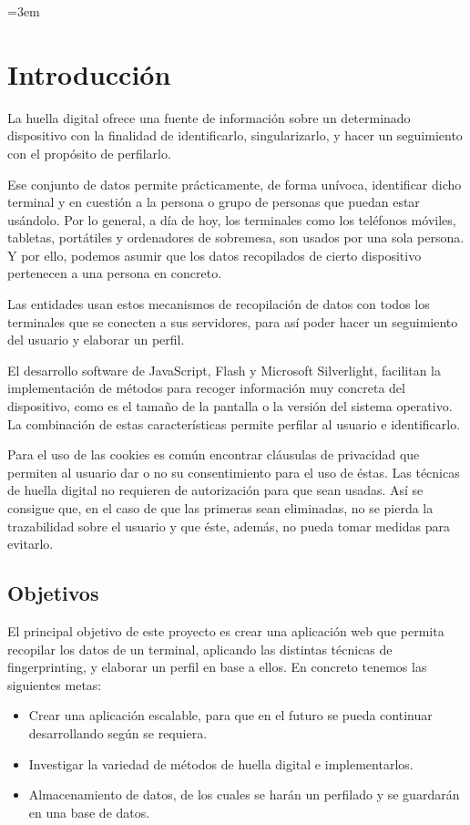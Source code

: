 \parindent=3em
\chapter{Introducción}
\noindent
La huella digital ofrece una fuente de información sobre un determinado dispositivo con la finalidad de identificarlo, singularizarlo, y hacer un seguimiento con el propósito de perfilarlo.\par
Ese conjunto de datos permite prácticamente, de forma unívoca, identificar dicho terminal y en cuestión a la persona o grupo de personas que puedan estar usándolo. Por lo general, a día de hoy, los terminales como los teléfonos móviles, tabletas, portátiles y ordenadores de sobremesa, son usados por una sola persona. Y por ello, podemos asumir que los datos recopilados de cierto dispositivo pertenecen a una persona en concreto.\par
Las entidades usan estos mecanismos de recopilación de datos con todos los terminales que se conecten a sus servidores, para así poder hacer un seguimiento del usuario y elaborar un perfil.\par
El desarrollo software de JavaScript, Flash y Microsoft Silverlight, facilitan la implementación de métodos para recoger información muy concreta del dispositivo, como es el tamaño de la pantalla o la versión del sistema operativo. La combinación de estas características permite perfilar al usuario e identificarlo.\par
Para el uso de las cookies es común encontrar cláusulas de privacidad que permiten al usuario dar o no su consentimiento para el uso de éstas. Las técnicas de huella digital no requieren de autorización para que sean usadas. Así se consigue que, en el caso de que las primeras sean eliminadas, no se pierda la trazabilidad sobre el usuario y que éste, además, no pueda tomar medidas para evitarlo.\par
 
\section{Objetivos}
 
El principal objetivo de este proyecto es crear una aplicación web que permita recopilar los datos de un terminal, aplicando las distintas técnicas de fingerprinting, y elaborar un perfil en base a ellos. En concreto tenemos las siguientes metas:
\begin{itemize}
    \item Crear una aplicación escalable, para que en el futuro se pueda continuar desarrollando según se requiera.
    \item Investigar la variedad de métodos de huella digital e implementarlos.
    \item Almacenamiento de datos, de los cuales se harán un perfilado y se guardarán en una base de datos.
\end{itemize}

